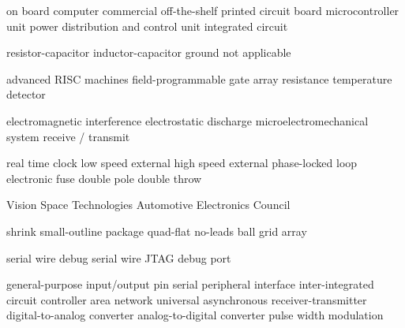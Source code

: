      {on board computer}
    {commercial off-the-shelf}
     {printed circuit board}
     {microcontroller unit}
    {power distribution and control unit}
      {integrated circuit}

      {resistor-capacitor}
      {inductor-capacitor}
     {ground}
      {not applicable}

     {advanced RISC machines}
    {field-programmable gate array}
     {resistance temperature detector}

     {electromagnetic interference}
     {electrostatic discharge}
    {microelectromechanical system}
   {receive / transmit}

     {real time clock}
     {low speed external}
     {high speed external}
     {phase-locked loop}
   {electronic fuse}
    {double pole double throw}

     {Vision Space Technologies}
     {Automotive Electronics Council}

    {shrink small-outline package}
     {quad-flat no-leads}
     {ball grid array}

     {serial wire debug}
  {serial wire JTAG debug port}

    {general-purpose input/output pin}
     {serial peripheral interface}
 {inter-integrated circuit}
     {controller area network}
    {universal asynchronous receiver-transmitter}
     {digital-to-analog converter}
     {analog-to-digital converter}
     {pulse width modulation}
